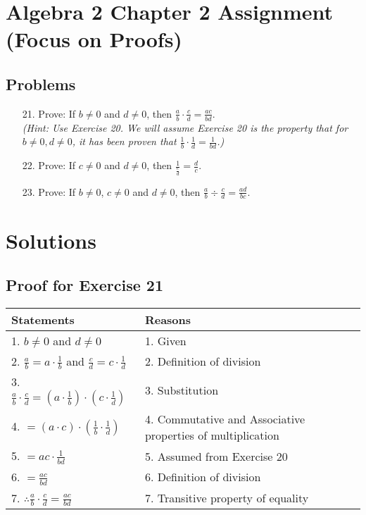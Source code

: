 \documentclass{article}
\begin{document}
\section*{Algebra 2 Chapter 2 Assignment (Focus on Proofs)}
\subsection*{Problems}

\begin{enumerate}
    \item[21.] Prove: If $b \neq 0$ and $d \neq 0$, then $\frac{a}{b} \cdot \frac{c}{d} = \frac{ac}{bd}$. \\
    \textit{(Hint: Use Exercise 20. We will assume Exercise 20 is the property that for $b \neq 0, d \neq 0$, it has been proven that $\frac{1}{b} \cdot \frac{1}{d} = \frac{1}{bd}$.)}
    
    \vspace{1cm}

    \item[22.] Prove: If $c \neq 0$ and $d \neq 0$, then $\frac{1}{\frac{c}{d}} = \frac{d}{c}$.
    
    \vspace{1cm}

    \item[23.] Prove: If $b \neq 0$, $c \neq 0$ and $d \neq 0$, then $\frac{a}{b} \div \frac{c}{d} = \frac{ad}{bc}$.
\end{enumerate}

\newpage

\section*{Solutions}

\subsection*{Proof for Exercise 21}
\begin{tabular}{l p{7cm}}
    \textbf{Statements} & \textbf{Reasons} \\
    \hline
    1. $b \neq 0$ and $d \neq 0$ & 1. Given \\
    2. $\frac{a}{b} = a \cdot \frac{1}{b}$ and $\frac{c}{d} = c \cdot \frac{1}{d}$ & 2. Definition of division \\
    3. $\frac{a}{b} \cdot \frac{c}{d} = \left(a \cdot \frac{1}{b}\right) \cdot \left(c \cdot \frac{1}{d}\right)$ & 3. Substitution \\
    4. $= (a \cdot c) \cdot \left(\frac{1}{b} \cdot \frac{1}{d}\right)$ & 4. Commutative and Associative properties of multiplication \\
    5. $= ac \cdot \frac{1}{bd}$ & 5. Assumed from Exercise 20 \\
    6. $= \frac{ac}{bd}$ & 6. Definition of division \\
    7. $\therefore \frac{a}{b} \cdot \frac{c}{d} = \frac{ac}{bd}$ & 7. Transitive property of equality \\
\end{tabular}
\end{document}
